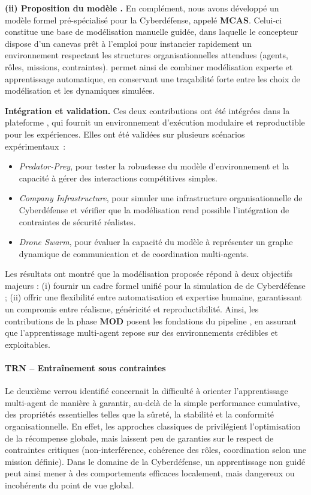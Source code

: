\medskip
\noindent
\textbf{(ii) Proposition du modèle .}
En complément, nous avons développé un modèle formel  pré-spécialisé pour la Cyberdéfense, appelé \textbf{MCAS}.
Celui-ci constitue une base de modélisation manuelle guidée, dans laquelle le concepteur dispose d'un canevas prêt à l'emploi pour instancier rapidement un environnement respectant les structures organisationnelles attendues (agents, rôles, missions, contraintes).
 permet ainsi de combiner modélisation experte et apprentissage automatique, en conservant une traçabilité forte entre les choix de modélisation et les dynamiques simulées.

\medskip
\noindent
\textbf{Intégration et validation.}
Ces deux contributions ont été intégrées dans la plateforme , qui fournit un environnement d'exécution modulaire et reproductible pour les expériences.
Elles ont été validées sur plusieurs scénarios expérimentaux~:
\begin{itemize}
  \item \textit{Predator-Prey}, pour tester la robustesse du modèle d'environnement et la capacité à gérer des interactions compétitives simples.
  \item \textit{Company Infrastructure}, pour simuler une infrastructure organisationnelle de Cyberdéfense et vérifier que la modélisation rend possible l'intégration de contraintes de sécurité réalistes.
  \item \textit{Drone Swarm}, pour évaluer la capacité du modèle à représenter un graphe dynamique de communication et de coordination multi-agents.
\end{itemize}

\noindent
Les résultats ont montré que la modélisation proposée répond à deux objectifs majeurs :
(i) fournir un cadre formel unifié pour la simulation de  de Cyberdéfense ;
(ii) offrir une flexibilité entre automatisation et expertise humaine, garantissant un compromis entre réalisme, généricité et reproductibilité.
Ainsi, les contributions de la phase \textbf{MOD} posent les fondations du pipeline , en assurant que l'apprentissage multi-agent repose sur des environnements crédibles et exploitables.


\paragraph{TRN – Entraînement sous contraintes}

Le deuxième verrou identifié concernait la difficulté à orienter l'apprentissage multi-agent de manière à garantir, au-delà de la simple performance cumulative, des propriétés essentielles telles que la sûreté, la stabilité et la conformité organisationnelle.
En effet, les approches classiques de  privilégient l'optimisation de la récompense globale, mais laissent peu de garanties sur le respect de contraintes critiques (non-interférence, cohérence des rôles, coordination selon une mission définie).
Dans le domaine de la Cyberdéfense, un apprentissage non guidé peut ainsi mener à des comportements efficaces localement, mais dangereux ou incohérents du point de vue global.

